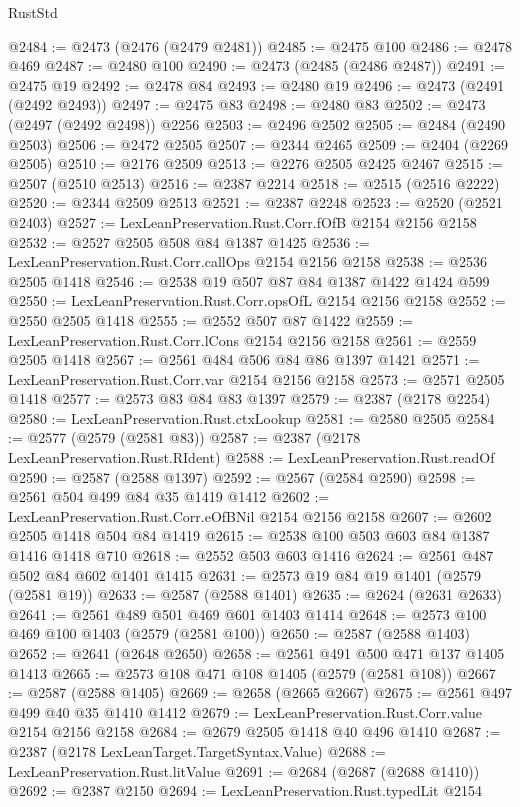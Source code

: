 \begin{lexlean}{RustStd}
\begin{coremodule}
{\begin{coremodule}
{{{{{{{{{{@2484 := @2473 (@2476 (@2479 @2481))
@2485 := @2475 @100
@2486 := @2478 @469
@2487 := @2480 @100
@2490 := @2473 (@2485 (@2486 @2487))
@2491 := @2475 @19
@2492 := @2478 @84
@2493 := @2480 @19
@2496 := @2473 (@2491 (@2492 @2493))
@2497 := @2475 @83
@2498 := @2480 @83
@2502 := @2473 (@2497 (@2492 @2498)) @2256
@2503 := @2496 @2502
@2505 := @2484 (@2490 @2503)
@2506 := @2472 @2505
@2507 := @2344 @2465
@2509 := @2404 (@2269 @2505)
@2510 := @2176 @2509
@2513 := @2276 @2505 @2425 @2467
@2515 := @2507 (@2510 @2513)
@2516 := @2387 @2214
@2518 := @2515 (@2516 @2222)
@2520 := @2344 @2509 @2513
@2521 := @2387 @2248
@2523 := @2520 (@2521 @2403)
@2527 := LexLeanPreservation.Rust.Corr.fOfB @2154 @2156 @2158
@2532 := @2527 @2505 @508 @84 @1387 @1425
@2536 := LexLeanPreservation.Rust.Corr.callOps @2154 @2156 @2158
@2538 := @2536 @2505 @1418
@2546 := @2538 @19 @507 @87 @84 @1387 @1422 @1424 @599
@2550 := LexLeanPreservation.Rust.Corr.opsOfL @2154 @2156 @2158
@2552 := @2550 @2505 @1418
@2555 := @2552 @507 @87 @1422
@2559 := LexLeanPreservation.Rust.Corr.lCons @2154 @2156 @2158
@2561 := @2559 @2505 @1418
@2567 := @2561 @484 @506 @84 @86 @1397 @1421
@2571 := LexLeanPreservation.Rust.Corr.var @2154 @2156 @2158
@2573 := @2571 @2505 @1418
@2577 := @2573 @83 @84 @83 @1397
@2579 := @2387 (@2178 @2254)
@2580 := LexLeanPreservation.Rust.ctxLookup
@2581 := @2580 @2505
@2584 := @2577 (@2579 (@2581 @83))
@2587 := @2387 (@2178 LexLeanPreservation.Rust.RIdent)
@2588 := LexLeanPreservation.Rust.readOf
@2590 := @2587 (@2588 @1397)
@2592 := @2567 (@2584 @2590)
@2598 := @2561 @504 @499 @84 @35 @1419 @1412
@2602 := LexLeanPreservation.Rust.Corr.eOfBNil @2154 @2156 @2158
@2607 := @2602 @2505 @1418 @504 @84 @1419
@2615 := @2538 @100 @503 @603 @84 @1387 @1416 @1418 @710
@2618 := @2552 @503 @603 @1416
@2624 := @2561 @487 @502 @84 @602 @1401 @1415
@2631 := @2573 @19 @84 @19 @1401 (@2579 (@2581 @19))
@2633 := @2587 (@2588 @1401)
@2635 := @2624 (@2631 @2633)
@2641 := @2561 @489 @501 @469 @601 @1403 @1414
@2648 := @2573 @100 @469 @100 @1403 (@2579 (@2581 @100))
@2650 := @2587 (@2588 @1403)
@2652 := @2641 (@2648 @2650)
@2658 := @2561 @491 @500 @471 @137 @1405 @1413
@2665 := @2573 @108 @471 @108 @1405 (@2579 (@2581 @108))
@2667 := @2587 (@2588 @1405)
@2669 := @2658 (@2665 @2667)
@2675 := @2561 @497 @499 @40 @35 @1410 @1412
@2679 := LexLeanPreservation.Rust.Corr.value @2154 @2156 @2158
@2684 := @2679 @2505 @1418 @40 @496 @1410
@2687 := @2387 (@2178 LexLeanTarget.TargetSyntax.Value)
@2688 := LexLeanPreservation.Rust.litValue
@2691 := @2684 (@2687 (@2688 @1410))
@2692 := @2387 @2150
@2694 := LexLeanPreservation.Rust.typedLit @2154
}}}}}}}}}}
\end{coremodule}}
\end{coremodule}
\end{lexlean}
